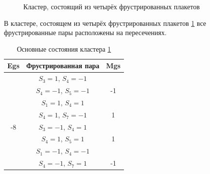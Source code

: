 \documentclass[utf8, babel, sor, jor, amsmath, amssymb, reprint]{elsarticle} %
\begin{document}
\begin{figure}[h]
	\centering
	\caption{Кластер, состоящий из четырёх фрустрированных плакетов}
	\label{fig:3x3}
\end{figure}

В кластере, состоящем из четырёх фрустрированных плакетов \ref{fig:3x3} все фрустрированные пары расположены на пересечениях.

\begin{table}[h]
	\centering
	\begin{tabular}{|c|c|c|}
		\hline
		Egs   &   Фрустрированная пара & Mgs\\
		\hline
		   &  $S_3=1$, $S_4=-1$&\\
		&    $S_4=-1$, $S_5=-1$ & -1\\
	\cline{2-3}
		   &  $S_1=1$, $S_4=1$&\\
		&    $S_4=1$, $S_7=-1$ & 1\\
			\cline{2-3}
		-8	\multirow{3}{*}{}
		  &  $S_3=-1$, $S_4=1$&\\
			&    $S_4=1$, $S_5=1$& 1\\
		\cline{2-3}
		   &  $S_1=-1$, $S_4=-1$&\\
			&    $S_4=-1$, $S_7=1$& -1\\
		\hline
	\end{tabular}
	\caption{Основные состояния кластера \ref{fig:3x3}}
	\label{tab:gs_3x3}
\end{table} 
\end{document}
